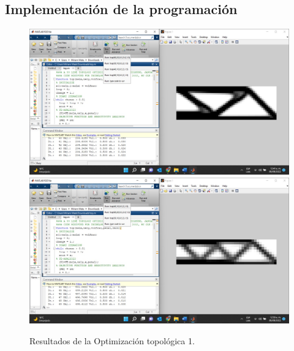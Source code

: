 \documentclass{article}
\begin{document}
\subsection{Implementación de la programación}
\begin{figure}[htp]
 \centering
   { \includegraphics[width=1\textwidth]{Optimizar.jpeg}}
   {\includegraphics[width=1\textwidth]{Optimizacion.jpeg}}
     \caption{Resultados de la Optimización topológica 1.}
\end{figure}
   
\end{document}
